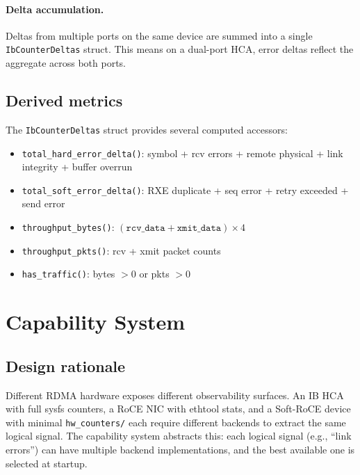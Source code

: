 \documentclass[11pt]{article}
\begin{document}
\paragraph{Delta accumulation.}
Deltas from multiple ports on the same device are summed into a single
\texttt{IbCounterDeltas} struct. This means on a dual-port HCA, error deltas
reflect the aggregate across both ports.

\subsection{Derived metrics}

The \texttt{IbCounterDeltas} struct provides several computed accessors:
\begin{itemize}[nosep]
  \item \texttt{total\_hard\_error\_delta()}: symbol + rcv errors + remote physical + link integrity + buffer overrun
  \item \texttt{total\_soft\_error\_delta()}: RXE duplicate + seq error + retry exceeded + send error
  \item \texttt{throughput\_bytes()}: $(\texttt{rcv\_data} + \texttt{xmit\_data}) \times 4$
  \item \texttt{throughput\_pkts()}: rcv + xmit packet counts
  \item \texttt{has\_traffic()}: bytes $> 0$ or pkts $> 0$
\end{itemize}


\section{Capability System}
\label{sec:capabilities}

\subsection{Design rationale}

Different RDMA hardware exposes different observability surfaces. An IB HCA
with full sysfs counters, a RoCE NIC with ethtool stats, and a Soft-RoCE
device with minimal \texttt{hw\_counters/} each require different backends
to extract the same logical signal. The capability system abstracts this:
each logical signal (e.g., ``link errors'') can have multiple backend
implementations, and the best available one is selected at startup.
\end{document}

